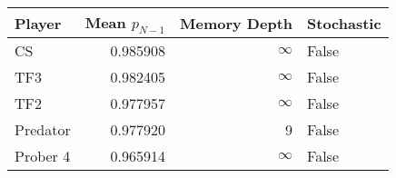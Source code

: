 \begin{tabular}{lrrl}
\toprule
   Player &  Mean $p_{N-1}$ &  Memory Depth & Stochastic \\
\midrule
       CS &        0.985908 &            \(\infty\) &      False \\
      TF3 &        0.982405 &            \(\infty\) &      False \\
      TF2 &        0.977957 &            \(\infty\) &      False \\
 Predator &        0.977920 &             9 &      False \\
 Prober 4 &        0.965914 &            \(\infty\) &      False \\
\bottomrule
\end{tabular}
